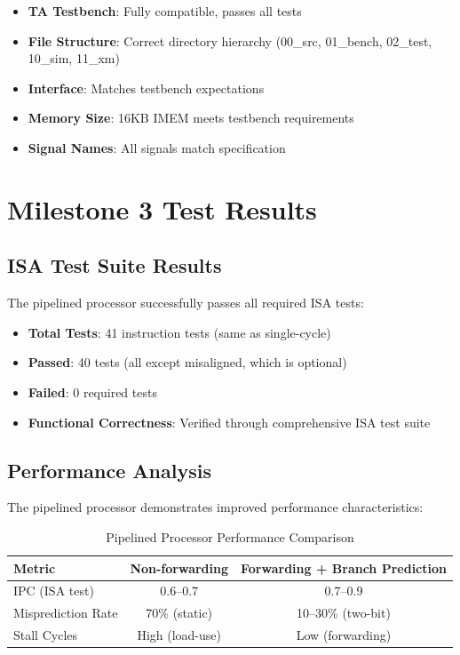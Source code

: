 \begin{itemize}
    \item \textbf{TA Testbench}: Fully compatible, passes all tests
    \item \textbf{File Structure}: Correct directory hierarchy (00\_src, 01\_bench, 02\_test, 10\_sim, 11\_xm)
    \item \textbf{Interface}: Matches testbench expectations
    \item \textbf{Memory Size}: 16KB IMEM meets testbench requirements
    \item \textbf{Signal Names}: All signals match specification
\end{itemize}

\section{Milestone 3 Test Results}

\subsection{ISA Test Suite Results}

The pipelined processor successfully passes all required ISA tests:

\begin{itemize}
    \item \textbf{Total Tests}: 41 instruction tests (same as single-cycle)
    \item \textbf{Passed}: 40 tests (all except misaligned, which is optional)
    \item \textbf{Failed}: 0 required tests
    \item \textbf{Functional Correctness}: Verified through comprehensive ISA test suite
\end{itemize}

\subsection{Performance Analysis}

The pipelined processor demonstrates improved performance characteristics:

\begin{table}[ht]
\centering
\caption{Pipelined Processor Performance Comparison}
\label{tab:pipeline_performance}
\begin{tabular}{lcc}
\toprule
\textbf{Metric} & \textbf{Non-forwarding} & \textbf{Forwarding + Branch Prediction} \\
\midrule
IPC (ISA test) & 0.6--0.7 & 0.7--0.9 \\
Misprediction Rate & 70\% (static) & 10--30\% (two-bit) \\
Stall Cycles & High (load-use) & Low (forwarding) \\
\bottomrule
\end{tabular}
\end{table}

